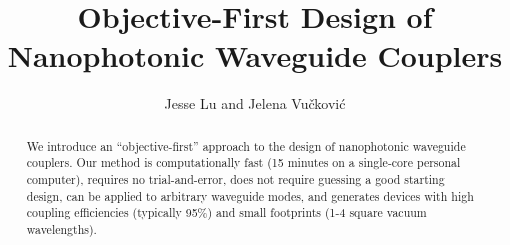 \documentclass[letterpaper,10pt]{article}
\begin{document}
\title{Objective-First Design of Nanophotonic Waveguide Couplers}
\author{Jesse Lu and Jelena Vu\v{c}kovi\'{c}}
\address{Stanford University, Stanford, California, USA.}

\maketitle
\begin{abstract}
We introduce an ``objective-first'' approach to the design of
    nanophotonic waveguide couplers.
Our method is
    computationally fast (15 minutes on a single-core personal computer), 
    requires no trial-and-error,
    does not require guessing a good starting design,
    can be applied to arbitrary waveguide modes,
    and generates devices with high coupling efficiencies (typically 95\%)
    and small footprints (1-4 square vacuum wavelengths).
\end{abstract}
\end{document}
